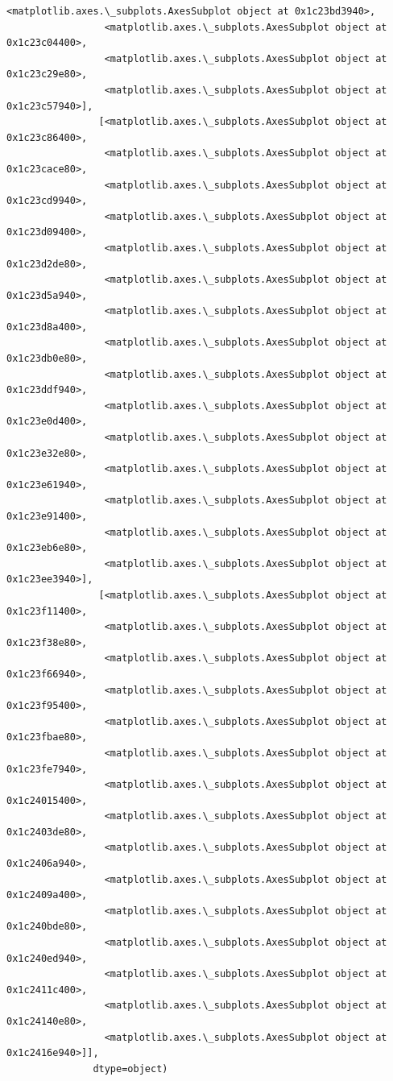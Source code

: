 \documentclass[11pt]{article}
\begin{document}
\begin{Verbatim}[commandchars=\\\{\}]
                 <matplotlib.axes.\_subplots.AxesSubplot object at 0x1c23bd3940>,
                 <matplotlib.axes.\_subplots.AxesSubplot object at 0x1c23c04400>,
                 <matplotlib.axes.\_subplots.AxesSubplot object at 0x1c23c29e80>,
                 <matplotlib.axes.\_subplots.AxesSubplot object at 0x1c23c57940>],
                [<matplotlib.axes.\_subplots.AxesSubplot object at 0x1c23c86400>,
                 <matplotlib.axes.\_subplots.AxesSubplot object at 0x1c23cace80>,
                 <matplotlib.axes.\_subplots.AxesSubplot object at 0x1c23cd9940>,
                 <matplotlib.axes.\_subplots.AxesSubplot object at 0x1c23d09400>,
                 <matplotlib.axes.\_subplots.AxesSubplot object at 0x1c23d2de80>,
                 <matplotlib.axes.\_subplots.AxesSubplot object at 0x1c23d5a940>,
                 <matplotlib.axes.\_subplots.AxesSubplot object at 0x1c23d8a400>,
                 <matplotlib.axes.\_subplots.AxesSubplot object at 0x1c23db0e80>,
                 <matplotlib.axes.\_subplots.AxesSubplot object at 0x1c23ddf940>,
                 <matplotlib.axes.\_subplots.AxesSubplot object at 0x1c23e0d400>,
                 <matplotlib.axes.\_subplots.AxesSubplot object at 0x1c23e32e80>,
                 <matplotlib.axes.\_subplots.AxesSubplot object at 0x1c23e61940>,
                 <matplotlib.axes.\_subplots.AxesSubplot object at 0x1c23e91400>,
                 <matplotlib.axes.\_subplots.AxesSubplot object at 0x1c23eb6e80>,
                 <matplotlib.axes.\_subplots.AxesSubplot object at 0x1c23ee3940>],
                [<matplotlib.axes.\_subplots.AxesSubplot object at 0x1c23f11400>,
                 <matplotlib.axes.\_subplots.AxesSubplot object at 0x1c23f38e80>,
                 <matplotlib.axes.\_subplots.AxesSubplot object at 0x1c23f66940>,
                 <matplotlib.axes.\_subplots.AxesSubplot object at 0x1c23f95400>,
                 <matplotlib.axes.\_subplots.AxesSubplot object at 0x1c23fbae80>,
                 <matplotlib.axes.\_subplots.AxesSubplot object at 0x1c23fe7940>,
                 <matplotlib.axes.\_subplots.AxesSubplot object at 0x1c24015400>,
                 <matplotlib.axes.\_subplots.AxesSubplot object at 0x1c2403de80>,
                 <matplotlib.axes.\_subplots.AxesSubplot object at 0x1c2406a940>,
                 <matplotlib.axes.\_subplots.AxesSubplot object at 0x1c2409a400>,
                 <matplotlib.axes.\_subplots.AxesSubplot object at 0x1c240bde80>,
                 <matplotlib.axes.\_subplots.AxesSubplot object at 0x1c240ed940>,
                 <matplotlib.axes.\_subplots.AxesSubplot object at 0x1c2411c400>,
                 <matplotlib.axes.\_subplots.AxesSubplot object at 0x1c24140e80>,
                 <matplotlib.axes.\_subplots.AxesSubplot object at 0x1c2416e940>]],
               dtype=object)
\end{Verbatim}
            
\end{document}
